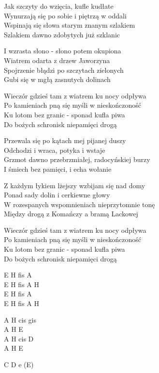 \begin{text}
Jak szczyty do wzięcia, kufle kudłate\\
Wynurzają się po sobie i piętrzą w oddali\\
Wspinają się słowa starym znanym szlakiem\\
Szlakiem dawno zdobytych już szklanic

I wzrasta słono - słono potem okupiona\\
Wiatrem odarta z drzew Jaworzyna\\
Spojrzenie błądzi po szczytach zielonych\\
Gubi się w mgłą zasnutych dolinach

\vin Wieczór gdzieś tam z wiatrem ku nocy odpływa\\
\vin Po kamieniach pną się myśli w nieskończoność\\
\vin Ku lotom bez granic - sponad kufla piwa\\
\vin Do bożych schronisk niepamięci drogą

Przewala się po kątach mej pijanej duszy\\
Odchodzi i wraca, potyka i wstaje\\
Grzmot dawno przebrzmiałej, radocyńskiej burzy\\
I śmiech bez pamięci, i echa wołanie

Z każdym łykiem lżejszy wzbijam się nad domy\\
Ponad sady dolin i cerkiewne głowy\\
W rozespanych wspomnieniach nieprzytomnie tonę\\
Między drogą z Komańczy a bramą Lackowej

\vin Wieczór gdzieś tam z wiatrem ku nocy odpływa\\
\vin Po kamieniach pną się myśli w nieskończoność\\
\vin Ku lotom bez granic - sponad kufla piwa\\
\vin Do bożych schronisk niepamięci drogą
\end{text}
\begin{chord}
    E H fis A\\
    E H fis A H\\
    E H fis A\\
    E H fis A H

    \hfill\break
    \hfill\break
    \hfill\break

    A H cis gis\\
    A H E\\
    A H cis D\\
    A H E

    \hfill\break
    \hfill\break
    \hfill\break
    \hfill\break
    \hfill\break
    \hfill\break
	\hfill\break
	\hfill\break
    C D e (E)
\end{chord}